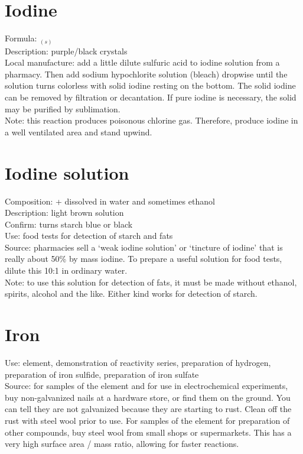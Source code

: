 \section{Iodine}
Formula: $_{(s)}$\\
Description: purple/black crystals\\
Local manufacture: add a little dilute sulfuric acid 
to iodine solution from a pharmacy. 
Then add sodium hypochlorite solution (bleach) dropwise 
until the solution turns colorless with solid iodine resting on the bottom. 
The solid iodine can be removed by filtration or decantation. 
If pure iodine is necessary, 
the solid may be purified by sublimation.\\
Note: this reaction produces poisonous chlorine gas. 
Therefore, 
produce iodine in a well ventilated area and stand upwind.

\section{Iodine solution}
\label{sec:iodinesol}
Composition:  +  dissolved in water and sometimes ethanol\\
Description: light brown solution\\
Confirm: turns starch blue or black\\
Use: food tests for detection of starch and fats\\
Source: pharmacies sell a ‘weak iodine solution’ 
or ‘tincture of iodine’ that is really about 50\% by mass iodine. 
To prepare a useful solution for food tests, 
dilute this 10:1 in ordinary water.\\
Note: to use this solution for detection of fats, 
it must be made without ethanol, 
spirits, 
alcohol and the like. 
Either kind works for detection of starch.

\section{Iron}
\label{sec:iron}
Use: element, 
demonstration of reactivity series, 
preparation of hydrogen, 
preparation of iron sulfide, 
preparation of iron sulfate\\
Source: for samples of the element 
and for use in electrochemical experiments, 
buy non-galvanized nails at a hardware store, 
or find them on the ground. 
You can tell they are not galvanized because they are starting to rust. 
Clean off the rust with steel wool prior to use. 
For samples of the element for preparation of other compounds, 
buy steel wool from small shops or supermarkets. 
This has a very high surface area / mass ratio, 
allowing for faster reactions.

